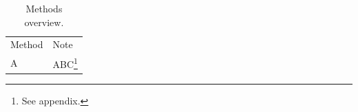 \documentclass[article]{jss}
\begin{document}
\begin{table}
\begin{tabular}{ll}
Method & Note \\
A & ABC\footnote{See appendix.} \\
\end{tabular}
\caption{Methods overview.}
\end{table}
\end{document}
